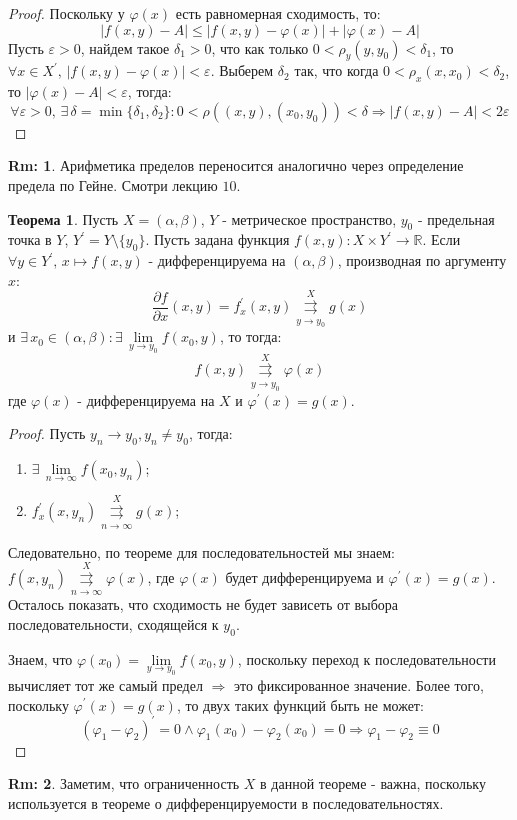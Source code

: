 \documentclass[12pt]{article}
\newcommand{\MR}{\mathbb{R}}
\newcommand{\VE}{\varepsilon}
\theoremstyle{definition}
\newtheorem{rem}{Rm:}
\newtheorem{theorem}{Теорема}
\newcommand{\uconvm}[2]{\overset{#1}{\underset{#2}{\rightrightarrows}}}
\begin{document}
\begin{proof}
	Поскольку у $\varphi(x)$ есть равномерная сходимость, то:
	$$
		|f(x,y) - A| \leq |f(x,y) - \varphi(x)| + |\varphi(x) - A|
	$$
	Пусть $\VE > 0$, найдем такое $\delta_1 > 0$, что как только $0 < \rho_y(y,y_0) < \delta_1$, то $\forall x\in X^\prime, \, |f(x,y) - \varphi(x)| < \VE$. Выберем $\delta_2$ так, что когда $0 < \rho_x(x,x_0) < \delta_2$, то $|\varphi(x) - A| < \VE$, тогда:
	$$
		\forall \VE > 0, \, \exists \, \delta = \min\{\delta_1, \delta_2\} \colon 0 < \rho((x,y),(x_0,y_0)) < \delta \Rightarrow |f(x,y) - A| < 2\VE
	$$
\end{proof}
\begin{rem}
	Арифметика пределов переносится аналогично через определение предела по Гейне. Смотри лекцию $10$.
\end{rem}

\begin{theorem}
	Пусть $X = (\alpha,\beta)$, $Y$ - метрическое пространство, $y_0$ - предельная точка в $Y$, $Y^\prime = Y \setminus \{y_0\}$. Пусть задана функция $f(x,y) \colon X \times Y^\prime \to \MR$. Если $\forall y \in Y^\prime, \, x \mapsto f(x,y)$ - дифференцируема на $(\alpha,\beta)$, производная по аргументу $x$: 
	$$
		\dfrac{\partial f}{\partial x}(x,y) = f_x^\prime(x,y) \uconvm{X}{y \to y_0}g(x)
	$$ 
	и $\exists \, x_0 \in (\alpha, \beta) \colon \exists \, \lim\limits_{y \to y_0}f(x_0, y)$, то тогда:
	$$
		f(x,y) \uconvm{X}{y \to y_0}\varphi(x)
	$$
	где $\varphi(x)$ - дифференцируема на $X$ и $\varphi^\prime(x) = g(x)$.
\end{theorem}
\begin{proof}
	Пусть $y_n \to y_0, y_n \neq y_0$, тогда: 
	\begin{enumerate}[label=(\arabic*)]
		\item $\exists \, \lim\limits_{n \to \infty}f(x_0, y_n)$;
		\item $f_x^\prime(x,y_n) \uconvm{X}{n \to \infty}g(x)$;
	\end{enumerate}
	Следовательно, по теореме для последовательностей мы знаем: $f(x,y_n) \uconvm{X}{n \to \infty} \varphi(x)$, где $\varphi(x)$ будет дифференцируема и $\varphi^\prime(x) = g(x)$. Осталось показать, что сходимость не будет зависеть от выбора последовательности, сходящейся к $y_0$. 
	
	Знаем, что $\varphi(x_0) = \lim\limits_{y \to y_0}f(x_0,y)$, поскольку переход к последовательности вычисляет тот же самый предел $\Rightarrow$ это фиксированное значение. Более того, поскольку $\varphi^\prime(x) = g(x)$, то двух таких функций быть не может:
	$$
		(\varphi_1 - \varphi_2)^\prime = 0 \wedge \varphi_1(x_0) - \varphi_2(x_0) = 0 \Rightarrow \varphi_1 - \varphi_2 \equiv 0
	$$
\end{proof}
\begin{rem}
	Заметим, что ограниченность $X$ в данной теореме - важна, поскольку используется в теореме о дифференцируемости в последовательностях.
\end{rem}
\end{document}
